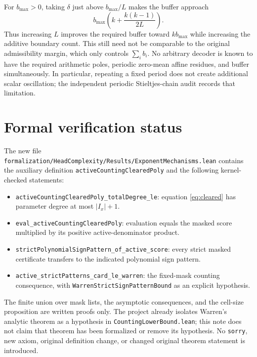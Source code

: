 \documentclass[11pt]{article}
\begin{document}
For $b_{\max}>0$, taking $\delta$ just above $b_{\max}/L$ makes
the buffer approach
\[
 b_{\max}\left(k+\frac{k(k-1)}{2L}\right).
\]
Thus increasing $L$ improves the required buffer toward
$kb_{\max}$ while increasing the additive boundary count. This
still need not be comparable to the original admissibility margin,
which only controls $\sum_i b_i$. No arbitrary decoder is known to
have the required arithmetic poles, periodic zero-mean affine
residues, and buffer simultaneously. In particular, repeating a
fixed period does not create additional scalar oscillation; the
independent periodic Stieltjes-chain audit records that limitation.

\section{Formal verification status}

The new file
\texttt{formalization/HeadComplexity/Results/ExponentMechanisms.lean}
contains the auxiliary definition \texttt{activeCountingClearedPoly}
and the following kernel-checked statements:
\begin{itemize}
\item \texttt{activeCountingClearedPoly\_totalDegree\_le}: equation
\eqref{eq:cleared} has parameter degree at most $|I_x|+1$.
\item \texttt{eval\_activeCountingClearedPoly}: evaluation equals the
masked score multiplied by its positive active-denominator product.
\item \texttt{strictPolynomialSignPattern\_of\_active\_score}:
every strict masked certificate transfers to the indicated polynomial
sign pattern.
\item \texttt{active\_strictPatterns\_card\_le\_warren}: the fixed-mask
counting consequence, with \texttt{WarrenStrictSignPatternBound} as an
explicit hypothesis.
\end{itemize}
The finite union over mask lists, the asymptotic consequences, and the
cell-size proposition are written proofs only. The project already
isolates Warren's analytic theorem as a hypothesis in
\texttt{CountingLowerBound.lean}; this note does not claim that theorem
has been formalized or remove its hypothesis. No \texttt{sorry}, new
axiom, original definition change, or changed original theorem statement
is introduced.
\end{document}
